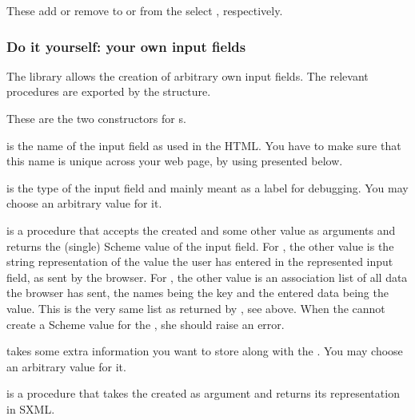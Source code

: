 \begin{desc}
  These add or remove  to or from the select
  , respectively.
\end{desc}
	   

\subsubsection{Do it yourself: your own input fields}

The \surflets library allows the creation of arbitrary own input
  fields.  The relevant procedures are exported by the
   structure.

\begin{desc}
  These are the two constructors for s.  

   is the name of the input field as used in the HTML.  You
  have to make sure that this name is unique across your web page, \eg
  by using  presented below.  

   is the type of the input field and mainly meant as a
  label for debugging.  You may choose an arbitrary value for it.
  
   is a procedure that accepts the created
   and some other value as arguments and returns the
  (single) Scheme value of the input field.  For
  , the other value is the string representation
  of the value the user has entered in the represented input field, as
  sent by the browser.  For , the other
  value is an association list of all data the browser has sent, the
  names being the key and the entered data being the value.  This is
  the very same list as returned by , see above.
  When the  cannot create a Scheme value for the
  , she should raise an error.

   takes some extra information you want to store
  along with the .  You may choose an arbitrary value
  for it. 

   is a procedure that takes the created
   as argument and returns its representation in SXML.
\end{desc}

